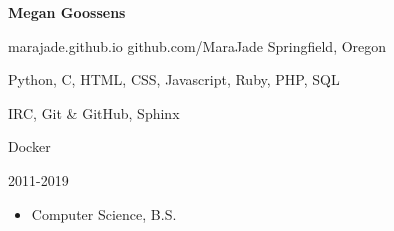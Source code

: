 \documentclass[11pt]{article} %
\begin{document}
\centerline{{\Huge \bf Megan Goossens}}
\bigskip


        {marajade.github.io}
        {github.com/MaraJade}
        {Springfield, Oregon}



      {Python, C, HTML, CSS, Javascript, Ruby, PHP, SQL}

      {IRC, Git \& GitHub, Sphinx}

      {Docker}


\begin{description}
\squish
{}
           {}
           {2011-2019}

\begin{itemize}
  \item Computer Science, B.S.
\end{itemize}

\end{description}

\end{document}
